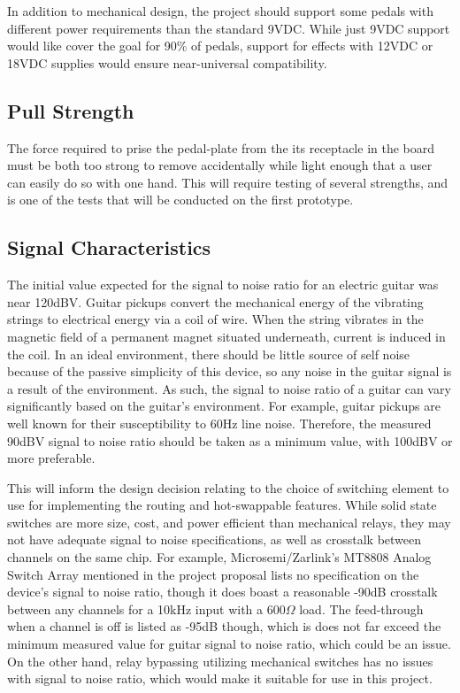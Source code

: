 \documentclass{article}
\begin{document}
	In addition to mechanical design, the project should support some pedals with different power requirements than the standard 9VDC.  While just 9VDC support would like cover the goal for 90\% of pedals, support for effects with 12VDC or 18VDC supplies would ensure near-universal compatibility.

	\subsection{Pull Strength}
	The force required to prise the pedal-plate from the its receptacle in the board must be both too strong to remove accidentally while light enough that a user can easily do so with one hand.  This will require testing of several strengths, and is one of the tests that will be conducted on the first prototype.

	\subsection{Signal Characteristics}
	The initial value expected for the signal to noise ratio for an electric guitar was near 120dBV.  Guitar pickups convert the mechanical energy of the vibrating strings to electrical energy via a coil of wire.  When the string vibrates in the magnetic field of a permanent magnet situated underneath, current is induced in the coil.  In an ideal environment, there should be little source of self noise because of the passive simplicity of this device, so any noise in the guitar signal is a result of the environment.  As such, the signal to noise ratio of a guitar can vary significantly based on the guitar's environment.  For example, guitar pickups are well known for their susceptibility to 60Hz line noise.  Therefore, the measured 90dBV signal to noise ratio should be taken as a minimum value, with 100dBV or more preferable.

	This will inform the design decision relating to the choice of switching element to use for implementing the routing and hot-swappable features.  While solid state switches are more size, cost, and power efficient than mechanical relays, they may not have adequate signal to noise specifications, as well as crosstalk between channels on the same chip.  For example, Microsemi/Zarlink's MT8808 Analog Switch Array mentioned in the project proposal \cite{Zarlink:MT8808} lists no specification on the device's signal to noise ratio, though it does boast a reasonable -90dB crosstalk between any channels for a 10kHz input with a $600 \Omega$ load.  The feed-through when a channel is off is listed as -95dB though, which is does not far exceed the minimum measured value for guitar signal to noise ratio, which could be an issue.  On the other hand, relay bypassing utilizing mechanical switches has no issues with signal to noise ratio, which would make it suitable for use in this project.
\end{document}
